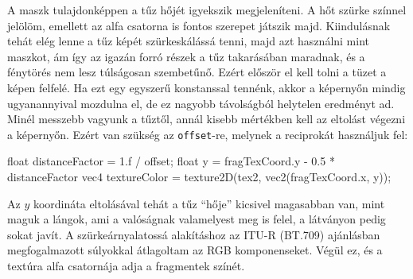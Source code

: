 A maszk tulajdonképpen a tűz hőjét igyekszik megjeleníteni. A hőt szürke színnel jelölöm, emellett az alfa csatorna is fontos szerepet játszik majd. Kiindulásnak tehát elég lenne a tűz képét szürkeskálássá tenni, majd azt használni mint maszkot, ám így az igazán forró részek a tűz takarásában maradnak, és a fénytörés nem lesz túlságosan szembetűnő. Ezért először el kell tolni a tüzet a képen felfelé. Ha ezt egy egyszerű konstanssal tennénk, akkor a képernyőn mindig ugyanannyival mozdulna el, de ez nagyobb távolságból helytelen eredményt ad. Minél messzebb vagyunk a tűztől, annál kisebb mértékben kell az eltolást végezni a képernyőn. Ezért van szükség az \texttt{offset}-re, melynek a reciprokát használjuk fel:
\begin{cpp}
float distanceFactor = 1.f / offset;
float y = fragTexCoord.y - 0.5 * distanceFactor
vec4 textureColor = texture2D(tex2, vec2(fragTexCoord.x, y));
\end{cpp}
Az $y$ koordináta eltolásával tehát a tűz ``hője'' kicsivel magasabban van, mint maguk a lángok, ami a valóságnak valamelyest meg is felel, a látványon pedig sokat javít. A szürkeárnyalatossá alakításhoz az ITU-R (BT.709) ajánlásban megfogalmazott súlyokkal átlagoltam az RGB komponenseket. Végül ez, és a textúra alfa csatornája adja a fragmentek színét.







